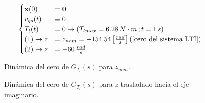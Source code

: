 \documentclass[a4paper, 10pt, onecolumn,journal]{ieeeconf}
\begin{document}
\begin{equation}
    \begin{cases}
        \mathbf{x}(0) &= \mathbf{0}\\
        v_{qs}(t) &\equiv 0\\
        T_l(t) &= 0 \rightarrow  \left(T_{lmax} = 6.28 \, N \cdot m\,; t = 1\,s\right)\\
        \left(1\right)\rightarrow z &= z_{nom} = -154.54\left[\frac{rad}{s}\right]\left(\cref{cero del sistema LTI}\right)\\
	    \left(2\right)\rightarrow z &= -60\,\frac{rad}{s}
    \end{cases}
	\label{condiciones simulacion dinamica de ceros}
\end{equation}
 
\begin{figure}[thpb]
	\centering
	\begin{adjustbox}{max width=\columnwidth}
	\end{adjustbox}
	\caption{Dinámica del cero de $G_{T_l}(s)$ para $z_{nom}$.}
	\label{dinámica de cero nominal}
\end{figure}

\begin{figure}[H]
	\centering
	\begin{adjustbox}{max width=\columnwidth}
	\end{adjustbox}
	\caption{Dinámica del cero de $G_{T_l}(s)$ para $z$ trasladado hacia el eje imaginario.}
	\label{dinámica de cero exagerada}
\end{figure}
\end{document}
